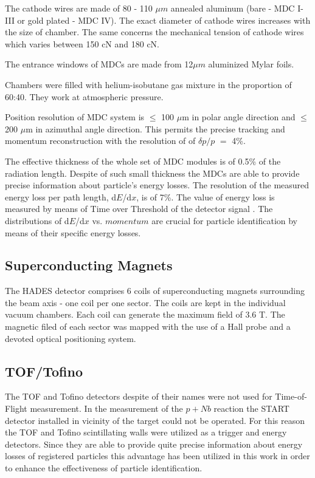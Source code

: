 The cathode wires are made of 80 - 110 $\mu m$ annealed aluminum 
(bare - MDC I-III or gold plated - MDC IV). 
The exact diameter of cathode wires increases with the size of chamber.
The same concerns the mechanical tension of cathode wires which varies between 150 cN and 180 cN.

The entrance windows of  MDCs are made from 12$\mu m$ aluminized Mylar foils.

Chambers were filled with helium-isobutane gas mixture in the proportion of 60:40. They work at atmospheric pressure.  

Position resolution of MDC system is $\le$ 100 $\mu$m in polar angle direction and $\le$ 200 $\mu$m 
in azimuthal angle direction. This permits the precise tracking and momentum reconstruction 
with the resolution of of $\delta{p}/p$ $=$ 4\%.

The effective thickness of the whole set of MDC modules is of 0.5\% of the radiation length. 
Despite of such small thickness the MDCs are able to provide precise information 
about particle's energy losses. The resolution of the measured energy loss per path length, 
d$E$/d$x$, is of 7\%. The value of energy loss is measured by means of Time over Threshold 
of the detector signal \cite{Kipnis}. 
The distributions of d$E$/d$x$ vs. $momentum$ 
are crucial for particle identification by means 
of their specific energy losses.



\subsection{Superconducting Magnets}

The HADES detector comprises 6 coils of superconducting magnets surrounding 
the beam axis - one coil per one sector. The coils are kept in the individual vacuum chambers. 
Each coil can generate the maximum field of 3.6 T. 
The magnetic filed of each sector was mapped with the use of a Hall probe 
and a devoted optical positioning system. 

\subsection{TOF/Tofino}

The TOF and Tofino detectors despite of their names were not used for Time-of-Flight measurement.
In the measurement of the $p+Nb$ reaction the START detector installed in vicinity of the target could not be operated.
For this reason the TOF and Tofino scintillating walls were utilized as a trigger and energy detectors. 
Since they are able to provide quite precise information about energy losses of registered particles  
this advantage has been utilized in this work in order to enhance the effectiveness of particle identification.  


